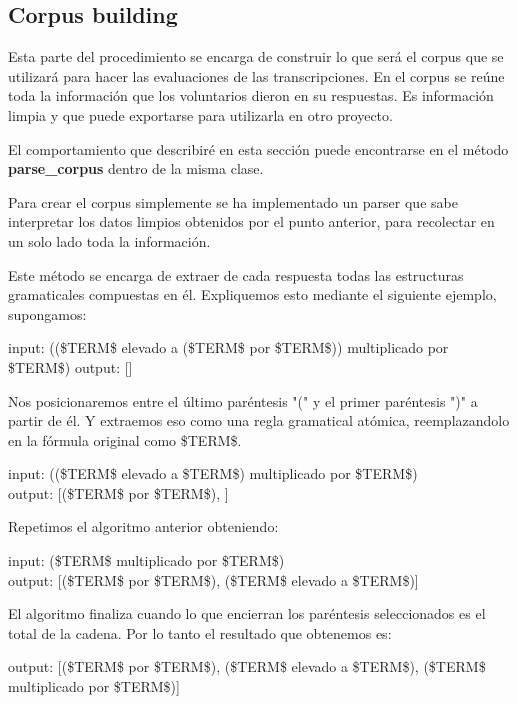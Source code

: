 \subsection{Corpus building}

Esta parte del procedimiento se encarga de construir lo que será el corpus que se utilizará para hacer las evaluaciones de las transcripciones. En el corpus se reúne toda la información que los voluntarios dieron en su respuestas. Es información limpia y que puede exportarse para utilizarla en otro proyecto.

El comportamiento que describiré en esta sección puede encontrarse en el método \textbf{parse\_corpus} dentro de la misma clase.

Para crear el corpus simplemente se ha implementado un parser que sabe interpretar los datos limpios obtenidos por el punto anterior, para recolectar en un solo lado toda la información.

Este método se encarga de extraer de cada respuesta todas las estructuras gramaticales compuestas en él. Expliquemos esto mediante el siguiente ejemplo, supongamos:

\begin{tcolorbox}
input: ((\$TERM\$ elevado a (\$TERM\$ por \$TERM\$)) multiplicado por \$TERM\$)
output: []
\end{tcolorbox}

Nos posicionaremos entre el último paréntesis "(" y el primer paréntesis ")" a partir de él. Y extraemos eso como una regla gramatical atómica, reemplazandolo en la fórmula original como \$TERM\$.

\begin{tcolorbox}
input: ((\$TERM\$ elevado a \$TERM\$) multiplicado por \$TERM\$) \\
output: [(\$TERM\$ por \$TERM\$), ]
\end{tcolorbox}

Repetimos el algoritmo anterior obteniendo:

\begin{tcolorbox}
input: (\$TERM\$ multiplicado por \$TERM\$) \\
output: [(\$TERM\$ por \$TERM\$), (\$TERM\$ elevado a \$TERM\$)]
\end{tcolorbox}

El algoritmo finaliza cuando lo que encierran los paréntesis seleccionados es el total de la cadena. Por lo tanto el resultado que obtenemos es:

\begin{tcolorbox}
output: [(\$TERM\$ por \$TERM\$), (\$TERM\$ elevado a \$TERM\$), (\$TERM\$ multiplicado por \$TERM\$)]
\end{tcolorbox}

